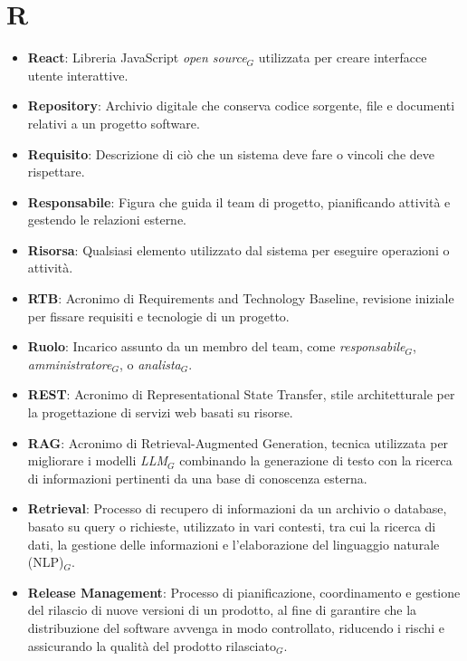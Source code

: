 \section{R}
\begin{itemize}
    \item \textbf{React}: Libreria JavaScript \textit{open source}$_G$ utilizzata per creare interfacce utente interattive.
    \item \textbf{Repository}: Archivio digitale che conserva codice sorgente, file e documenti relativi a un progetto software.
    \item \textbf{Requisito}: Descrizione di ciò che un sistema deve fare o vincoli che deve rispettare.
    \item \textbf{Responsabile}: Figura che guida il team di progetto, pianificando attività e gestendo le relazioni esterne.
    \item \textbf{Risorsa}: Qualsiasi elemento utilizzato dal sistema per eseguire operazioni o attività.
    \item \textbf{RTB}: Acronimo di Requirements and Technology Baseline, revisione iniziale per fissare requisiti e tecnologie di un progetto.
    \item \textbf{Ruolo}: Incarico assunto da un membro del team, come \textit{responsabile}$_G$, \textit{amministratore}$_G$, o \textit{analista}$_G$.
    \item \textbf{REST}: Acronimo di Representational State Transfer, stile architetturale per la progettazione di servizi web basati su risorse.
    \item \textbf{RAG}: Acronimo di Retrieval-Augmented Generation, tecnica utilizzata per migliorare i modelli \textit{LLM}$_G$ combinando la generazione di testo con la ricerca di informazioni pertinenti da una base di conoscenza esterna.
    \item \textbf{Retrieval}: Processo di recupero di informazioni da un archivio o database, basato su query o richieste, utilizzato in vari contesti, tra cui la ricerca di dati, la gestione delle informazioni e l'elaborazione del linguaggio naturale (NLP)$_G$.
    \item \textbf{Release Management}: Processo di pianificazione, coordinamento e gestione del rilascio di nuove versioni di un prodotto, al fine di garantire che la distribuzione del software avvenga in modo controllato, riducendo i rischi e assicurando la qualità del prodotto rilasciato$_G$.

\end{itemize}
